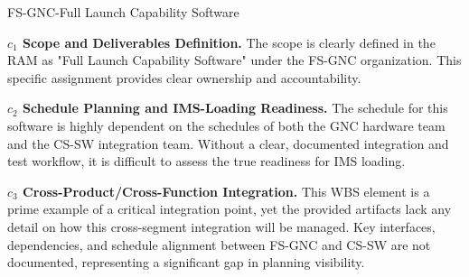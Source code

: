 %
\begin{frame}{FS-GNC-Full Launch Capability Software}
\begin{minipage}{0.90\textwidth}
\raggedright
\fontsize{8}{9.5}\selectfont
\textbf{\(c_1\) Scope and Deliverables Definition.}
The scope is clearly defined in the RAM as "Full Launch Capability Software" under the FS-GNC organization. This specific assignment provides clear ownership and accountability.\par\vspace{0.6em}
\textbf{\(c_2\) Schedule Planning and IMS-Loading Readiness.}
The schedule for this software is highly dependent on the schedules of both the GNC hardware team and the CS-SW integration team. Without a clear, documented integration and test workflow, it is difficult to assess the true readiness for IMS loading.\par\vspace{0.6em}
\textbf{\(c_3\) Cross-Product/Cross-Function Integration.}
This WBS element is a prime example of a critical integration point, yet the provided artifacts lack any detail on how this cross-segment integration will be managed. Key interfaces, dependencies, and schedule alignment between FS-GNC and CS-SW are not documented, representing a significant gap in planning visibility.\par\vspace{0.6em}
\end{minipage}
\end{frame}

\endinput
